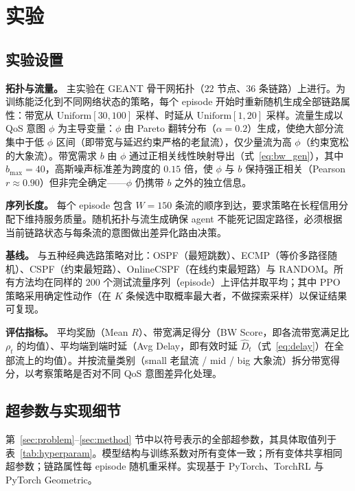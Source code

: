 \section{实验}
\label{sec:exp}

\subsection{实验设置}
\label{sec:exp:setup}

\textbf{拓扑与流量。} 主实验在 GEANT 骨干网拓扑（$22$ 节点、$36$ 条链路）上进行。为训练能泛化到不同网络状态的策略，每个 episode 开始时重新随机生成全部链路属性：带宽从 $\text{Uniform}[30,100]$ 采样、时延从 $\text{Uniform}[1,20]$ 采样。流量生成以 QoS 意图 $\phi$ 为主导变量：$\phi$ 由 Pareto 翻转分布（$\alpha\!=\!0.2$）生成，使绝大部分流集中于低 $\phi$ 区间（即带宽与延迟约束严格的老鼠流），仅少量流为高 $\phi$（约束宽松的大象流）。带宽需求 $b$ 由 $\phi$ 通过正相关线性映射导出（式~\eqref{eq:bw_gen}），其中 $b_{\text{max}}\!=\!40$，高斯噪声标准差为跨度的 $0.15$ 倍，使 $\phi$ 与 $b$ 保持强正相关（Pearson $r\!\approx\!0.90$）但非完全确定——$\phi$ 仍携带 $b$ 之外的独立信息。

\textbf{序列长度。} 每个 episode 包含 $W=150$ 条流的顺序到达，要求策略在长程信用分配下维持服务质量。随机拓扑与流生成确保 agent 不能死记固定路径，必须根据当前链路状态与每条流的意图做出差异化路由决策。

\textbf{基线。} 与五种经典选路策略对比：OSPF（最短跳数）、ECMP（等价多路径随机）、CSPF（约束最短路）、OnlineCSPF（在线约束最短路）与 RANDOM。所有方法均在同样的 $200$ 个测试流量序列（episode）上评估并取平均；其中 PPO 策略采用确定性动作（在 $K$ 条候选中取概率最大者，不做探索采样）以保证结果可复现。

\textbf{评估指标。} 平均奖励（Mean $R$）、带宽满足得分（BW Score，即各流带宽满足比 $\rho_t$ 的均值）、平均端到端时延（Avg Delay，即有效时延 $\hat D_t$（式~\eqref{eq:delay}）在全部流上的均值）。并按流量类别（small 老鼠流 / mid / big 大象流）拆分带宽得分，以考察策略是否对不同 QoS 意图差异化处理。

\subsection{超参数与实现细节}
\label{sec:exp:hyperparam}

第~\ref{sec:problem}--\ref{sec:method} 节中以符号表示的全部超参数，其具体取值列于表~\ref{tab:hyperparam}。模型结构与训练系数对所有变体一致；所有变体共享相同超参数；链路属性每 episode 随机重采样。实现基于 PyTorch、TorchRL 与 PyTorch Geometric。

